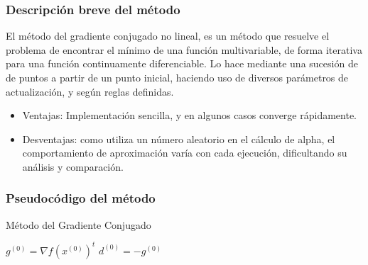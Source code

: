 \documentclass[12pt]{article}
\begin{document}
\subsubsection{Descripción breve del método}
El método del gradiente conjugado no lineal, es un método que resuelve el problema de encontrar el mínimo de una función multivariable, de forma iterativa para una función continuamente diferenciable. Lo hace mediante una sucesión de de puntos a partir de un punto inicial, haciendo uso de diversos parámetros de actualización, y según reglas definidas.
\begin{itemize}
    \item Ventajas: Implementación sencilla, y en algunos casos converge rápidamente.
    \item Desventajas: como utiliza un número aleatorio en el cálculo de alpha, el comportamiento de aproximación varía con cada ejecución, dificultando su análisis y comparación.
\end{itemize}
\subsubsection{Pseudocódigo del método}
\begin{algorithm}[H]
\caption{Método del Gradiente Conjugado}
    \SetAlgoLined
    \(g^{(0)} = \nabla{f(x^{(0)})}^t\)\;
    \(d^{(0)} = -g^{(0)}\)\;
    \While{error \(\;\geq\;\)tolerancia}{
        \(\alpha_{k} = 1\)\;
        \(\delta \in ]0,1[\)\;
        \While{\(f(x^{(k)} + \alpha_{k} d^{(k)}) - f(x^{(k)}) > \delta\alpha_k(g^{(k)})^t d^{(k)}\)}{
            \(\alpha_k = \alpha_k/2\)\;
        }
        \(x{(k+1)} = x^{(k)} + \alpha_{k} d^{(k)}\)\;
        \(g^{(k)} = \nabla{f(x^{(k)})}^t\)\;
        \(d^{(k+1)} = -g^{(k+1)} + \beta_{k}d^{(k)}\)\;
     }
\end{algorithm}
\end{document}
